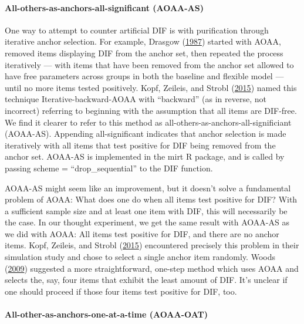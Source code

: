 \documentclass[
  11pt,
]{article}
\begin{document}
\hypertarget{all-others-as-anchors-all-significant-aoaa-as}{%
\paragraph{All-others-as-anchors-all-significant (AOAA-AS)}\label{all-others-as-anchors-all-significant-aoaa-as}}

One way to attempt to counter artificial DIF is with purification through iterative anchor selection. For example, Drasgow (\protect\hyperlink{ref-drasgow1987study}{1987}) started with AOAA, removed items displaying DIF from the anchor set, then repeated the process iteratively --- with items that have been removed from the anchor set allowed to have free parameters across groups in both the baseline and flexible model --- until no more items tested positively. Kopf, Zeileis, and Strobl (\protect\hyperlink{ref-kopf2015framework}{2015}) named this technique Iterative-backward-AOAA with \enquote{backward} (as in reverse, not incorrect) referring to beginning with the assumption that all items are DIF-free. We find it clearer to refer to this method as all-others-as-anchors-all-significiant (AOAA-AS). Appending all-significant indicates that anchor selection is made iteratively with all items that test positive for DIF being removed from the anchor set. AOAA-AS is implemented in the mirt R package, and is called by passing scheme = \enquote{drop\_sequential} to the DIF function.

AOAA-AS might seem like an improvement, but it doesn't solve a fundamental problem of AOAA: What does one do when all items test positive for DIF? With a sufficient sample size and at least one item with DIF, this will necessarily be the case. In our thought experiment, we get the same result with AOAA-AS as we did with AOAA: All items test positive for DIF, and there are no anchor items. Kopf, Zeileis, and Strobl (\protect\hyperlink{ref-kopf2015framework}{2015}) encountered precisely this problem in their simulation study and chose to select a single anchor item randomly. Woods (\protect\hyperlink{ref-woods2009empirical}{2009}) suggested a more straightforward, one-step method which uses AOAA and selects the, say, four items that exhibit the least amount of DIF. It's unclear if one should proceed if those four items test positive for DIF, too.

\hypertarget{all-other-as-anchors-one-at-a-time-aoaa-oat}{%
\paragraph{All-other-as-anchors-one-at-a-time (AOAA-OAT)}\label{all-other-as-anchors-one-at-a-time-aoaa-oat}}
\end{document}
